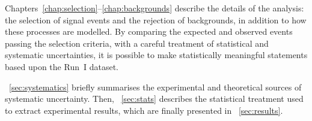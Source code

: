 
Chapters~\ref{chap:selection}--\ref{chap:backgrounds} describe the details of the \HWW 
analysis: the selection of signal events and the rejection of backgrounds, in addition to 
how these processes are modelled. By comparing the expected and observed events passing the 
selection criteria, with a careful treatment of statistical and systematic uncertainties, it 
is possible to make statistically meaningful statements based upon the Run~I dataset.

\Section~\ref{sec:systematics} briefly summarises the experimental and theoretical sources 
of systematic uncertainty. Then, \Section~\ref{sec:stats} describes the statistical 
treatment used to extract experimental results, which are finally presented in  
\Section~\ref{sec:results}.
